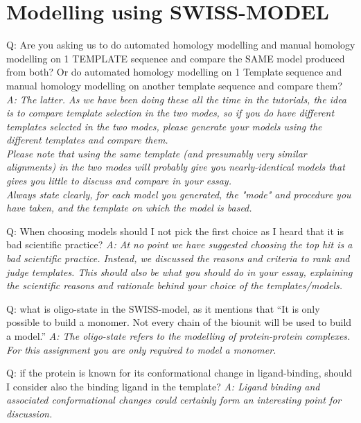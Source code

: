 \documentclass[10pt,a4paper]{article}
\begin{document}
\section{Modelling using SWISS-MODEL}
Q: Are you asking us to do automated homology modelling and manual homology modelling on 1 TEMPLATE sequence and compare the SAME model produced from both? Or do automated homology modelling on 1 Template sequence and manual homology modelling on another template sequence and compare them? \newline
\textit{A: The latter. As we have been doing these all the time in the tutorials, the idea is to compare template selection in the two modes, so if you do have different templates selected in the two modes, please generate your models using the different templates and compare them. \\ Please note that using the same template (and presumably very similar alignments) in the two modes will probably give you nearly-identical models that gives you little to discuss and compare in your essay. \\ Always state clearly, for each model you generated, the "mode" and procedure you have taken, and the template on which the model is based.} \newline

Q:  When choosing models should I not pick the first choice as I heard that it is bad scientific practice? \newline
\textit{A: At no point we have suggested choosing the top hit is a bad scientific practice. Instead, we discussed the reasons and criteria to rank and judge templates. This should also be what you should do in your essay, explaining the scientific reasons and rationale behind your choice of the templates/models.} \newline

Q: what is oligo-state in the SWISS-model, as it mentions that “It is only possible to build a monomer. Not every chain of the biounit will be used to build a model.” \newline
\textit{A: The oligo-state refers to the modelling of protein-protein complexes. For this assignment you are only required to model a monomer. } \newline

Q: if the protein is known for its conformational change in ligand-binding, should I consider also the binding ligand in the template? \newline
\textit{A: Ligand binding and associated conformational changes could certainly form an interesting point for discussion.} \newline
\end{document}
